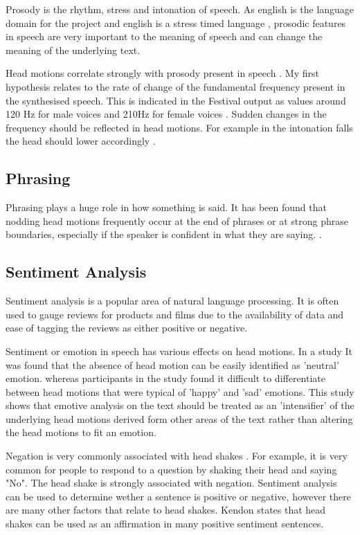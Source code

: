 \documentclass[bsc,frontabs,twoside,singlespacing,parskip]{infthesis}
\begin{document}
Prosody is the rhythm, stress and intonation of speech. As english is the language domain for the project and english is a stress timed language \cite{stress_timed}, prosodic features in speech are very important to the meaning of speech and can change the meaning of the underlying text.

Head motions correlate strongly with prosody present in speech \cite{vis_prosody}. My first hypothesis relates to the rate of change of the fundamental frequency present in the synthesised speech. This is indicated in the Festival output as values around 120 Hz for male voices and 210Hz for female voices \cite{f0_values}. Sudden changes in the frequency should be reflected in head motions. For example in the intonation falls the head should lower accordingly \cite{Kendon}.

\subsection{Phrasing}

Phrasing plays a huge role in how something is said. It has been found that nodding head motions frequently occur at the end of phrases or at strong phrase boundaries, especially if the speaker is confident in what they are saying. \cite{ishi2008}. 

\subsection{Sentiment Analysis}

Sentiment analysis is a popular area of natural language processing. It is often used to gauge reviews for products\cite{sentiment_online} and films\cite{sentiment_films} due to the availability of data and ease of tagging the reviews as either positive or negative.

Sentiment or emotion in speech has various effects on head motions. In a study It was found that the absence of head motion can be easily identified as 'neutral' emotion. \cite{emotion_head_motion} whereas participants in the study found it difficult to differentiate between head motions that were typical of 'happy' and 'sad' emotions. This study shows that emotive analysis on the text should be treated as an 'intensifier' of the underlying head motions derived form other areas of the text rather than altering the head motions to fit an emotion.

Negation is very commonly associated with head shakes \cite{head_shaking}. For example, it is very common for people to respond to a question by shaking their head and saying "No". The head shake is strongly associated with negation. Sentiment analysis can be used to determine wether a sentence is positive or negative, however there are many other factors that relate to head shakes. Kendon states that head shakes can be used as an affirmation \cite{kendon} in many positive sentiment sentences. 
\end{document}
